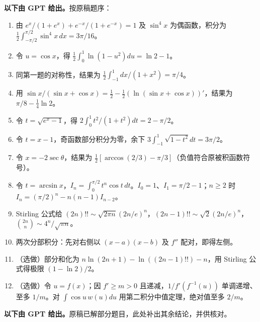 \noindent\textbf{以下由 GPT 给出。}按原稿题序：
\begin{enumerate}
\item 由 $e^x/(1+e^x)+e^{-x}/(1+e^{-x})=1$ 及 $\sin^4x$ 为偶函数，积分为 $\frac12\int_{-\pi/2}^{\pi/2}\sin^4x\,dx=3\pi/16$。
\item 令 $u=\cos x$，得 $\frac12\int_0^1\ln(1-u^2)du=\ln2-1$。
\item 同第一题的对称性，结果为 $\frac12\int_{-1}^1dx/(1+x^2)=\pi/4$。
\item 用 $\sin x/(\sin x+\cos x)=\frac12-\frac12(\ln(\sin x+\cos x))'$，结果为 $\pi/8-\frac14\ln2$。
\item 令 $t=\sqrt{e^x-1}$，得 $2\int_0^1t^2/(1+t^2)dt=2-\pi/2$。
\item 令 $t=x-1$，奇函数部分积分为零，余下 $3\int_{-1}^1\sqrt{1-t^2}dt=3\pi/2$。
\item 令 $x=-2\sec\theta$，结果为 $\frac12[\arccos(2/3)-\pi/3]$（负值符合原被积函数符号）。
\item 令 $t=\arcsin x$，$I_n=\int_0^{\pi/2}t^n\cos t\,dt$。$I_0=1$、$I_1=\pi/2-1$；$n\ge2$ 时 $I_n=(\pi/2)^n-n(n-1)I_{n-2}$。
\item Stirling 公式给 $(2n)!!\sim\sqrt{2\pi n}(2n/e)^n$，$(2n-1)!!\sim\sqrt2(2n/e)^n$，$\binom{2n}{n}\sim4^n/\sqrt{\pi n}$。
\item 两次分部积分：先对右侧以 $(x-a)(x-b)$ 及 $f''$ 配对，即得左侧。
\item（选做）部分和化为 $n\ln(2n+1)-\ln((2n-1)!!)-n$，用 Stirling 公式得极限 $(1-\ln2)/2$。
\item（选做）令 $u=f(x)$；因 $f'\ge m>0$ 且递减，$1/f'(f^{-1}(u))$ 单调递增、至多 $1/m$。对 $\int\cos u\,w(u)du$ 用第二积分中值定理，绝对值至多 $2/m$。
\end{enumerate}
\noindent\textbf{以下由 GPT 给出。}原稿已解部分题目，此处补出其余结论，并供核对。
